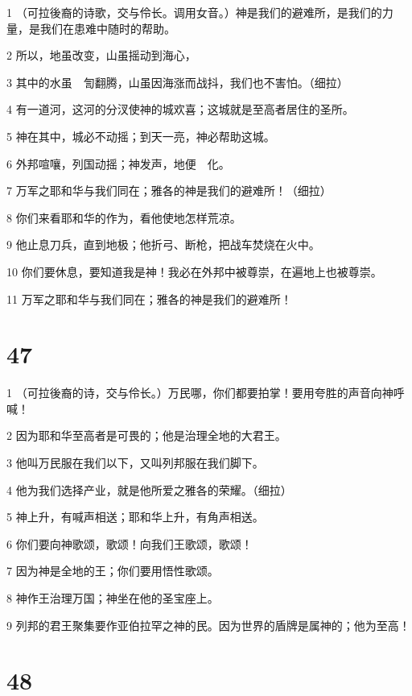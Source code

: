 \par 1 （可拉後裔的诗歌，交与伶长。调用女音。）神是我们的避难所，是我们的力量，是我们在患难中随时的帮助。
\par 2 所以，地虽改变，山虽摇动到海心，
\par 3 其中的水虽　訇翻腾，山虽因海涨而战抖，我们也不害怕。（细拉）
\par 4 有一道河，这河的分汊使神的城欢喜；这城就是至高者居住的圣所。
\par 5 神在其中，城必不动摇；到天一亮，神必帮助这城。
\par 6 外邦喧嚷，列国动摇；神发声，地便　化。
\par 7 万军之耶和华与我们同在；雅各的神是我们的避难所！（细拉）
\par 8 你们来看耶和华的作为，看他使地怎样荒凉。
\par 9 他止息刀兵，直到地极；他折弓、断枪，把战车焚烧在火中。
\par 10 你们要休息，要知道我是神！我必在外邦中被尊崇，在遍地上也被尊崇。
\par 11 万军之耶和华与我们同在；雅各的神是我们的避难所！

\chapter{47}

\par 1 （可拉後裔的诗，交与伶长。）万民哪，你们都要拍掌！要用夸胜的声音向神呼喊！
\par 2 因为耶和华至高者是可畏的；他是治理全地的大君王。
\par 3 他叫万民服在我们以下，又叫列邦服在我们脚下。
\par 4 他为我们选择产业，就是他所爱之雅各的荣耀。（细拉）
\par 5 神上升，有喊声相送；耶和华上升，有角声相送。
\par 6 你们要向神歌颂，歌颂！向我们王歌颂，歌颂！
\par 7 因为神是全地的王；你们要用悟性歌颂。
\par 8 神作王治理万国；神坐在他的圣宝座上。
\par 9 列邦的君王聚集要作亚伯拉罕之神的民。因为世界的盾牌是属神的；他为至高！

\chapter{48}

